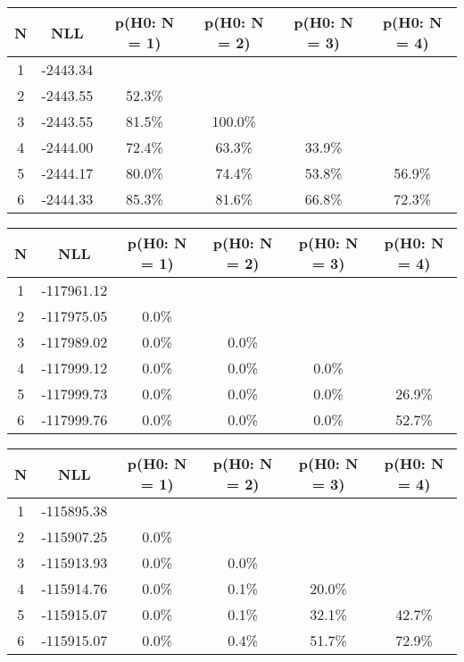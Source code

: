 \begin{table}[htb]
	\begin{center}
{\footnotesize\renewcommand{\arraystretch}{1.4}
		\begin{tabular}{cc||cccc}
			N & NLL & p(H0: N = 1) & p(H0: N = 2) & p(H0: N = 3) & p(H0: N = 4)\\ 
		\hline
1 & -2443.34 & & & & \\
2 & -2443.55 & 52.3\% & & & \\
3 & -2443.55 & 81.5\% & 100.0\% & & \\
4 & -2444.00 & 72.4\% & 63.3\% & 33.9\% & \\
5 & -2444.17 & 80.0\% & 74.4\% & 53.8\% & 56.9\% \\
6 & -2444.33 & 85.3\% & 81.6\% & 66.8\% & 72.3\% \\
	\end{tabular}
		\label{tab:lab}
	}
	\end{center}\end{table}

\begin{table}[htb]
	\begin{center}
{\footnotesize\renewcommand{\arraystretch}{1.4}
		\begin{tabular}{cc||cccc}
			N & NLL & p(H0: N = 1) & p(H0: N = 2) & p(H0: N = 3) & p(H0: N = 4)\\ 
		\hline
1 & -117961.12 & & & & \\
2 & -117975.05 & 0.0\% & & & \\
3 & -117989.02 & 0.0\% & 0.0\% & & \\
4 & -117999.12 & 0.0\% & 0.0\% & 0.0\% & \\
5 & -117999.73 & 0.0\% & 0.0\% & 0.0\% & 26.9\% \\
6 & -117999.76 & 0.0\% & 0.0\% & 0.0\% & 52.7\% \\
	\end{tabular}
		\label{tab:lab}
	}
	\end{center}\end{table}

\begin{table}[htb]
	\begin{center}
{\footnotesize\renewcommand{\arraystretch}{1.4}
		\begin{tabular}{cc||cccc}
			N & NLL & p(H0: N = 1) & p(H0: N = 2) & p(H0: N = 3) & p(H0: N = 4)\\ 
		\hline
1 & -115895.38 & & & & \\
2 & -115907.25 & 0.0\% & & & \\
3 & -115913.93 & 0.0\% & 0.0\% & & \\
4 & -115914.76 & 0.0\% & 0.1\% & 20.0\% & \\
5 & -115915.07 & 0.0\% & 0.1\% & 32.1\% & 42.7\% \\
6 & -115915.07 & 0.0\% & 0.4\% & 51.7\% & 72.9\% \\
	\end{tabular}
		\label{tab:lab}
	}
	\end{center}\end{table}

